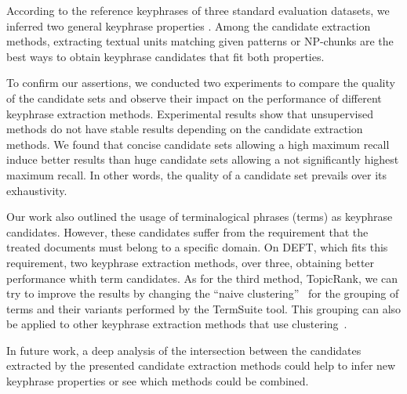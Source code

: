   According to the reference keyphrases of three standard evaluation datasets,
  we inferred two general keyphrase properties .
  Among the candidate extraction methods, extracting textual units matching
  given patterns or NP-chunks are the best ways to obtain keyphrase candidates
  that fit both properties.

  To confirm our assertions, we conducted two experiments to compare the quality
  of the candidate sets and observe their impact on
  the performance of different keyphrase extraction methods. Experimental
  results show that unsupervised methods do not have stable results depending on
  the candidate extraction methods. We found that concise candidate sets
  allowing a high maximum recall induce better results than huge candidate sets
  allowing a not significantly highest maximum recall. In other words, the
  quality of a candidate set prevails over its exhaustivity.

  Our work also outlined the usage of terminalogical phrases (terms) as
  keyphrase candidates. However, these candidates suffer from the requirement
  that the treated documents must belong to a specific domain. On DEFT, which
  fits this requirement, two keyphrase extraction methods, over three, obtaining
  better performance whith term candidates.  As for the third method, TopicRank, we can try to improve the results
  by changing the ``naive clustering''~\cite{bougouin2013topicrank} for the
  grouping of terms and their variants performed by the TermSuite tool. This
  grouping can also be applied to other keyphrase extraction methods that use
  clustering~\cite{matsuo2004wordcooccurrence}.

  In future work, a deep analysis of the intersection between the candidates
  extracted by the presented candidate extraction methods could help to infer
  new keyphrase properties or see which methods could be combined. 

